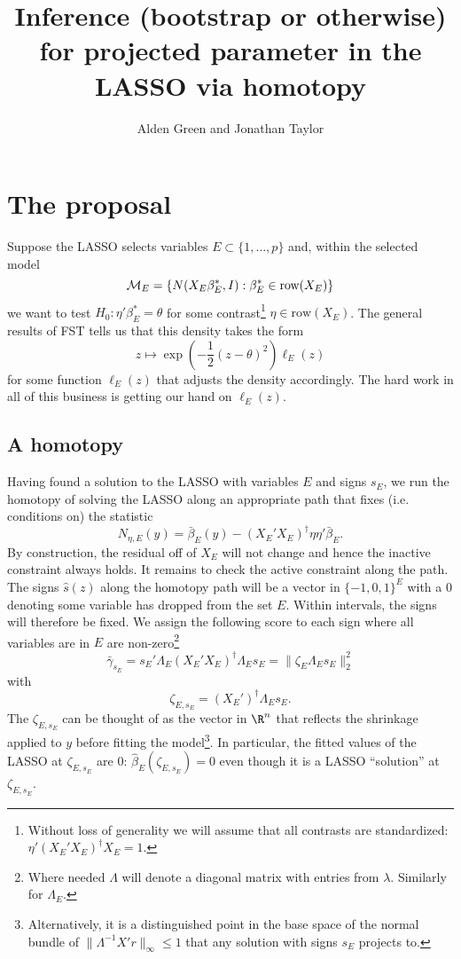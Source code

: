 \documentclass{article}
\title{ {\bf Inference (bootstrap or otherwise)
    for projected parameter in the LASSO via homotopy}}
\author{Alden Green and Jonathan Taylor}
\newcommand{\OLS}{\bar{\beta}}
\newcommand{\REG}{\hat{\beta}}
\begin{document}
	\maketitle \RaggedRight

        
        \section{The proposal}

        Suppose the LASSO selects variables $E \subset \{1, \dots, p\}$ and, within the
        selected model
        $${\cal M}_E = \left\{N(X_E\beta_E^*, I): \beta_E^* \in \text{row}(X_E)\right\}$$
        we want to
        test $H_0:\eta'\beta_E^*=\theta$ for some contrast\footnote{Without loss of generality we will assume that all contrasts are standardized: $\eta'(X_E'X_E)^{\dagger}X_E=1$.} $\eta \in \text{row}(X_E)$. The general
        results of FST tells us that this density takes the form
        $$
        z \mapsto \exp\left(-\frac{1}{2}(z-\theta)^2\right) \ell_E(z)
        $$
        for some function $\ell_E(z)$ that adjusts the density accordingly. The hard
        work in all of this business is getting our hand on $\ell_E(z)$.

        \subsection{A homotopy}

        Having found a solution to the LASSO with variables $E$ and signs $s_E$, we run the
        homotopy of solving the LASSO along an appropriate  path that fixes (i.e. conditions on)
        the statistic
        $$
        N_{\eta,E}(y) = \OLS_E(y) - (X_E'X_E)^{\dagger} \eta \eta'\OLS_E.
        $$ By construction, the residual off of $X_E$ will not change
        and hence the inactive constraint always holds. It remains to
        check the active constraint along the path.  The signs $\hat{s}(z)$ along
        the homotopy path will be a vector in $\{-1,0,1\}^E$ with a 0
        denoting some variable has dropped from the set $E$. Within
        intervals, the signs will therefore be fixed. We assign the
        following score to each sign where all variables are in $E$
        are non-zero\footnote{Where needed $\Lambda$ will denote a
          diagonal matrix with entries from $\lambda$. Similarly for
          $\Lambda_E$. 
        }
        $$
        \bar{\gamma}_{s_E} = s_E'\Lambda_E(X_E'X_E)^{\dagger}\Lambda_Es_E = \|\zeta_E\Lambda_Es_E\|^2_2
        $$
        with
        \begin{equation}
          \label{eq:sign:offsets}
        \zeta_{E,s_E} = (X_E')^{\dagger}\Lambda_Es_E.
        \end{equation}
The
          $\zeta_{E,s_E}$ can be thought of as the vector in $\R^n$
          that reflects the shrinkage applied to $y$ before fitting
          the model\footnote{Alternatively, it is a distinguished point 
          in the base space of the normal bundle of $\|\Lambda^{-1}X'r\|_{\infty} \leq 1$ that any solution with signs $s_E$ projects to.}. In particular, the fitted values of the LASSO at
          $\zeta_{E,s_E}$ are 0: $\REG_E(\zeta_{E,s_E})=0$ even though
          it is a LASSO ``solution'' at $\zeta_{E,s_E}$.
\end{document}
